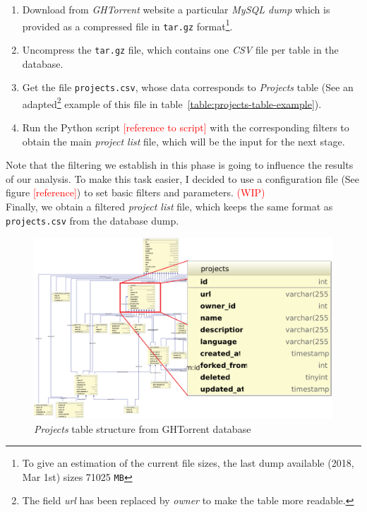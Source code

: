 \documentclass[a4paper, 12pt]{book}
\begin{document}
\begin{enumerate}
  \item Download from \emph{GHTorrent} website a particular \emph{MySQL dump} which is provided as a compressed file in \texttt{tar.gz}
        format\footnote{To give an estimation of the current file sizes, the last dump available (2018, Mar 1st) sizes 71025 \texttt{MB}}.
  \item Uncompress the \texttt{tar.gz} file, which contains one \emph{CSV} file per table in the database.
  \item Get the file \texttt{projects.csv}, whose data corresponds to \emph{Projects} table (See an adapted\footnote{The field \emph{url} has been replaced by \emph{owner} to make the table more readable.}
  example of this file in table~\ref{table:projects-table-example}).
  \item Run the Python script \textcolor{red}{[reference to script]} with the corresponding filters to obtain the main
        \emph{project list} file, which will be the input for the next stage.
\end{enumerate}
Note that the filtering we establish in this phase is going to influence the results of our analysis. To make this task easier,
I decided to use a configuration file (See figure \textcolor{red}{[reference]}) to set basic filters and parameters. \textcolor{red}{(WIP)}\\
Finally, we obtain a filtered \emph{project list} file, which keeps the same format as \texttt{projects.csv} from the database dump.
\begin{figure}
  \centering
  \includegraphics[width=16cm, keepaspectratio]{img/ghtorrent-schema-detail}
  \caption{\textit{Projects} table structure from GHTorrent database}
  \label{fig:ghtorrent-schema-detail}
\end{figure}
\end{document}
